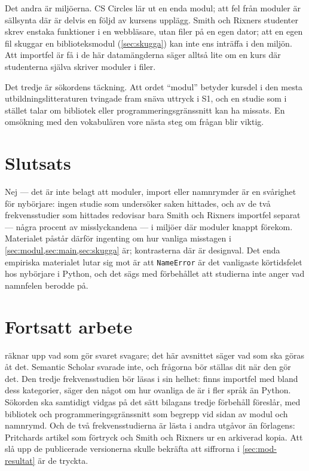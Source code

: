 Det andra är miljöerna.  CS Circles lär ut en enda modul; att fel från
moduler är sällsynta där är delvis en följd av kursens upplägg.
Smith och Rixners studenter skrev enstaka funktioner i en
webbläsare, utan filer på en egen dator; att en egen fil skuggar en
biblioteksmodul (\cref{sec:skugga}) kan inte ens inträffa i den
miljön.  Att importfel är få i de här datamängderna säger alltså lite
om en kurs där studenterna själva skriver moduler i filer.

Det tredje är sökordens täckning.  Att ordet \enquote{modul} betyder
kursdel i den mesta utbildningslitteraturen tvingade fram snäva
uttryck i S1, och en studie som i stället talar om bibliotek eller
programmeringsgränssnitt kan ha missats.  En omsökning med den
vokabulären vore nästa steg om frågan blir viktig.

\section{Slutsats}
\label{sec:mod-slutsats}

Nej --- det är inte belagt att moduler, import eller namnrymder är en
svårighet för nybörjare: ingen studie som undersöker saken hittades,
och av de två frekvensstudier som hittades redovisar bara Smith och
Rixners importfel separat --- några procent av misslyckandena --- i
miljöer där moduler knappt förekom.
Materialet påstår därför ingenting om hur vanliga misstagen i
\cref{sec:modul,sec:main,sec:skugga} är; kontrasterna där är
designval.  Det enda empiriska materialet lutar sig mot är att
\texttt{NameError} är det vanligaste körtidsfelet hos
nybörjare i Python, och det sägs med förbehållet att studierna inte
anger vad namnfelen berodde på.

\section{Fortsatt arbete}
\label{sec:mod-fortsatt}

 räknar upp vad som gör svaret svagare; det här
avsnittet säger vad som ska göras åt det.  Semantic Scholar svarade
inte, och frågorna bör ställas dit när den gör det.  Den tredje
frekvensstudien\autocite{Chandarana2023} bör läsas i sin helhet: finns
importfel med bland dess kategorier, säger den något om hur ovanliga de
är i fler språk än Python.
Sökorden ska samtidigt vidgas på det sätt bilagans tredje förbehåll
föreslår, med bibliotek och programmeringsgränssnitt som begrepp vid
sidan av modul och namnrymd.  Och de två frekvensstudierna är lästa i
andra utgåvor än förlagens: Pritchards artikel som förtryck och Smith
och Rixners ur en arkiverad kopia.  Att slå upp de publicerade
versionerna skulle bekräfta att siffrorna i \cref{sec:mod-resultat} är
de tryckta.

